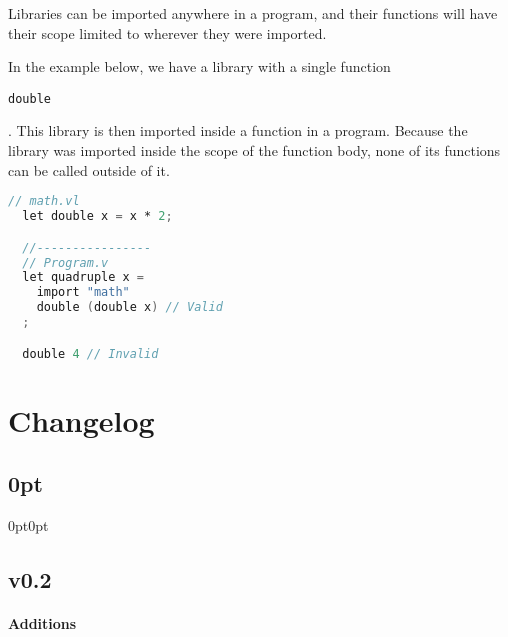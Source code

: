 \documentclass{article}
\def\code#1{\begin{footnotesize}\texttt{#1}\end{footnotesize}}
\begin{document}
Libraries can be imported anywhere in a program, and their functions will have their scope limited to wherever they were imported.

In the example below, we have a library with a single function \code{double}.
This library is then imported inside a function in a program.
Because the library was imported inside the scope of the function body, none of its functions can be called outside of it.

\begin{lstlisting}[language=V]
  // math.vl
  let double x = x * 2;

  //----------------
  // Program.v
  let quadruple x =
    import "math"
    double (double x) // Valid
  ;

  double 4 // Invalid
\end{lstlisting}

\section{Changelog}

\titlespacing\subsection{0pt}{0pt}{0pt}

\subsection*{v0.2}
{\small{}}

\paragraph{\large Additions}
\end{document}

